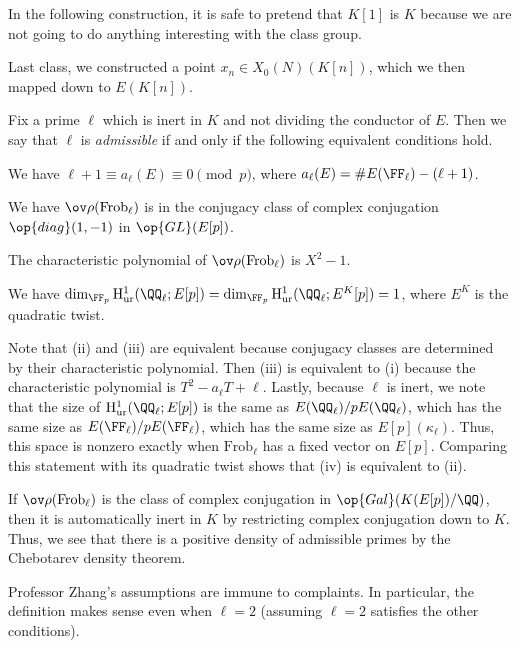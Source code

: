 \documentclass[../notes.tex]{subfiles}
\begin{document}
\begin{remark}
	In the following construction, it is safe to pretend that $K[1]$ is $K$ because we are not going to do anything interesting with the class group.
\end{remark}
Last class, we constructed a point $x_n\in X_0(N)(K[n])$, which we then mapped down to $E(K[n])$.
\begin{definition}[admissible]
	Fix a prime $\ell$ which is inert in $K$ and not dividing the conductor of $E$. Then we say that $\ell$ is \textit{admissible} if and only if the following equivalent conditions hold.
	\begin{listroman}
		\item We have $\ell+1\equiv a_\ell(E)\equiv0\pmod p$, where $a_\ell(E)=\#E(\FF_\ell)-(\ell+1)$.
		\item We have $\ov\rho(\mathrm{Frob}_\ell)$ is in the conjugacy class of complex conjugation $\op{diag}(1,-1)$ in $\op{GL}(E[p])$.
		\item The characteristic polynomial of $\ov\rho(\mathrm{Frob}_\ell)$ is $X^2-1$.
		\item We have $\dim_{\FF_p}\mathrm H^1_{\mathrm{ur}}(\QQ_\ell;E[p])=\dim_{\FF_p}\mathrm H^1_{\mathrm{ur}}(\QQ_\ell;E^K[p])=1$, where $E^K$ is the quadratic twist.
	\end{listroman}
\end{definition}
\begin{remark}
	Note that (ii) and (iii) are equivalent because conjugacy classes are determined by their characteristic polynomial. Then (iii) is equivalent to (i) because the characteristic polynomial is $T^2-a_\ell T+\ell$. Lastly, because $\ell$ is inert, we note that the size of $\mathrm H^1_{\mathrm{ur}}(\QQ_\ell;E[p])$ is the same as $E(\QQ_\ell)/pE(\QQ_\ell)$, which has the same size as $E(\FF_\ell)/pE(\FF_\ell)$, which has the same size as $E[p](\kappa_\ell)$. Thus, this space is nonzero exactly when $\mathrm{Frob}_\ell$ has a fixed vector on $E[p]$. Comparing this statement with its quadratic twist shows that (iv) is equivalent to (ii).
\end{remark}
\begin{remark}
	If $\ov\rho(\mathrm{Frob}_\ell)$ is the class of complex conjugation in $\op{Gal}(K(E[p])/\QQ)$, then it is automatically inert in $K$ by restricting complex conjugation down to $K$. Thus, we see that there is a positive density of admissible primes by the Chebotarev density theorem.
\end{remark}
\begin{remark}
	Professor Zhang's assumptions are immune to complaints. In particular, the definition makes sense even when $\ell=2$ (assuming $\ell=2$ satisfies the other conditions).
\end{remark}
\end{document}
